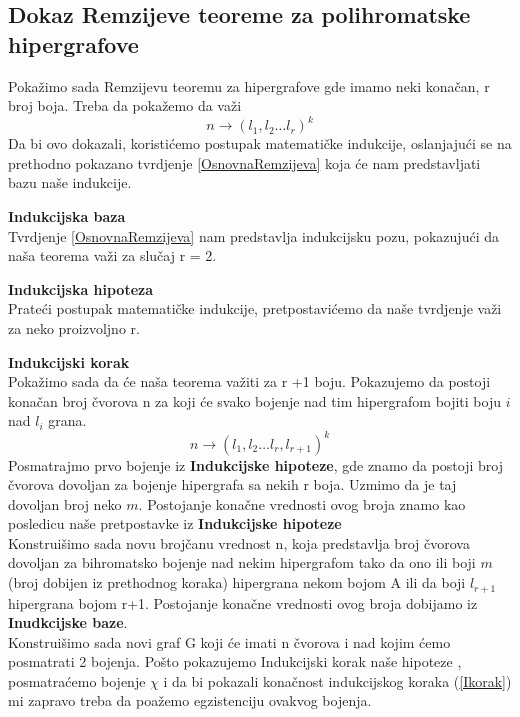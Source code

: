 \documentclass[a4paper]{article}
\begin{document}
	\subsection{Dokaz Remzijeve teoreme za polihromatske hipergrafove}
	Pokažimo sada Remzijevu teoremu za hipergrafove gde imamo neki konačan, r broj boja. Treba da pokažemo da važi 
	\begin{equation}
		n \rightarrow (l_1, l_2 \dots l_r)^k
	\end{equation}
	Da bi ovo dokazali, koristićemo postupak matematičke indukcije, oslanjajući se na prethodno pokazano tvrdjenje \ref{OsnovnaRemzijeva} koja će nam predstavljati bazu naše indukcije.
	\begin{description}
		\item \textbf{Indukcijska baza} \\
		Tvrdjenje \ref{OsnovnaRemzijeva} nam predstavlja indukcijsku pozu, pokazujući da naša teorema važi za slučaj r = 2.\\
		\item \textbf{Indukcijska hipoteza}\\
		Prateći postupak matematičke indukcije, pretpostavićemo da naše tvrdjenje važi za neko proizvoljno r.\\
		\item \textbf{Indukcijski korak}\\
		Pokažimo sada da će naša teorema važiti za r +1 boju.
		Pokazujemo da postoji konačan broj čvorova n za koji će svako bojenje nad tim hipergrafom bojiti boju $i$ nad $l_i$ grana. %
		\begin{equation}\label{Ikorak}
		 n \rightarrow (l_1, l_2 \dots l_r, l_{r+1})^k
		\end{equation}
		Posmatrajmo prvo bojenje iz \textbf{Indukcijske hipoteze}, gde znamo da postoji broj čvorova dovoljan za bojenje hipergrafa sa nekih r boja. Uzmimo da je taj dovoljan broj neko $m$. Postojanje konačne vrednosti ovog broja znamo kao posledicu naše pretpostavke iz \textbf{Indukcijske hipoteze}\\
		Konstruišimo sada novu brojčanu vrednost n, koja predstavlja broj čvorova dovoljan za bihromatsko bojenje nad nekim hipergrafom tako da ono ili boji $m$ (broj dobijen iz prethodnog koraka) hipergrana nekom bojom A ili da boji $l_{r+1}$ hipergrana bojom r+1. Postojanje konačne vrednosti ovog broja dobijamo iz \textbf{Inudkcijske baze}. 
		\\
		Konstruišimo sada novi graf G koji će imati n čvorova i nad kojim ćemo posmatrati 2 bojenja. Pošto pokazujemo Indukcijski korak naše hipoteze , posmatraćemo bojenje $\chi$ i da bi pokazali konačnost indukcijskog koraka (\ref{Ikorak}) mi zapravo treba da poažemo egzistenciju ovakvog bojenja.

\end{description}
\end{document}
